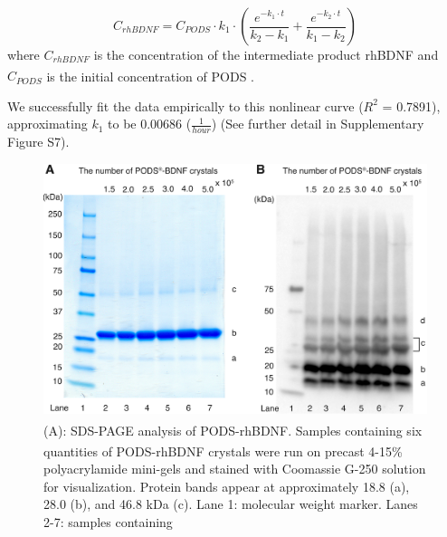 \documentclass[review]{elsarticle}
\begin{document}
\begin{equation}
C_{rhBDNF} =  C_{PODS} \cdot k_1 \cdot (\frac{e^{-k_1 \cdot t}}{ k_2-  k_1}  + \frac{e^{-k_2 \cdot t}}{ k_1 -  k_2} )
\end{equation}
where $C_{rhBDNF}$ is the concentration of the intermediate product rhBDNF and $C_{PODS}$ is the initial concentration of PODS\textsuperscript{\textregistered} \cite{levenspiel1999}.

 We successfully fit the data empirically to this nonlinear curve ($R^{2}$ = 0.7891), approximating $k_{1}$ to be 0.00686 ($\frac{1}{hour}$) (See further detail in Supplementary Figure S7).  
 
 \begin{figure}
 	\begin{center}
 		\includegraphics[width=13cm]{Fig_5.jpg}
 	\end{center}
 	\caption{(A): SDS-PAGE analysis of PODS\textsuperscript{\textregistered}-rhBDNF. Samples containing six quantities of PODS\textsuperscript{\textregistered}-rhBDNF crystals were run on precast 4-15\% polyacrylamide mini-gels and stained with Coomassie G-250 solution for visualization. Protein bands appear at approximately 18.8 (a), 28.0 (b), and 46.8 kDa (c). Lane 1: molecular weight marker. Lanes 2-7: samples containing   }
 \end{figure}
 
\end{document}
